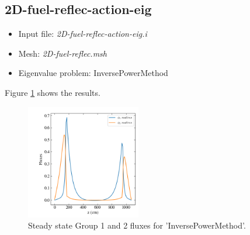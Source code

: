 \documentclass[11pt,letterpaper]{article}
\begin{document}
\subsection{2D-fuel-reflec-action-eig}

	\begin{itemize}
		\item Input file: \textit{2D-fuel-reflec-action-eig.i}
		\item Mesh: \textit{2D-fuel-reflec.msh}
		\item Eigenvalue problem: InversePowerMethod
	\end{itemize}

Figure \ref{fig:2D-fuel-reflec-action-eig} shows the results.

	\begin{figure}[htbp!]
		\centering
		\includegraphics[height=5cm]{2D-fuel-reflec-action-eig}
		\caption{Steady state Group 1 and 2 fluxes for 'InversePowerMethod'.}
		\label{fig:2D-fuel-reflec-action-eig}
	\end{figure}

\pagebreak

% 
\end{document}
